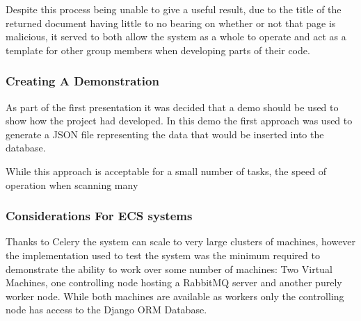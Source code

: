 Despite this process being unable to give a useful result, due to the title of the returned document having little to no bearing on whether or not that page is malicious, it served to both allow the system as a whole to operate and act as a template for other group members when developing parts of their code.

\subsubsection{Creating A Demonstration}
As part of the first presentation it was decided that a demo should be used to show how the project had developed.  In this demo the first approach was used to generate a JSON file representing the data that would be inserted into the database.

While this approach is acceptable for a small number of tasks, the speed of operation when scanning many 

\subsubsection{Considerations For ECS systems}
Thanks to Celery the system can scale to very large clusters of machines, however the implementation used to test the system was the minimum required to demonstrate the ability to work over some number of machines: Two Virtual Machines, one controlling node hosting a RabbitMQ server and another purely worker node. While both machines are available as workers only the controlling node has access to the Django ORM Database.